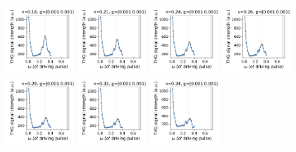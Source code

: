 \documentclass[a4paper]{article}
\begin{document}
\begin{figure}[H]
  \includegraphics[width=0.23\textwidth]{leggett-driving3-v7-case0.pdf}
  \includegraphics[width=0.23\textwidth]{leggett-driving3-v8-case0.pdf}
  \includegraphics[width=0.23\textwidth]{leggett-driving3-v9-case0.pdf}
  \includegraphics[width=0.23\textwidth]{leggett-driving3-v10-case0.pdf}
  \includegraphics[width=0.23\textwidth]{leggett-driving3-v11-case0.pdf}
  \includegraphics[width=0.23\textwidth]{leggett-driving3-v12-case0.pdf}
  \includegraphics[width=0.23\textwidth]{leggett-driving3-v13-case0.pdf}

\end{figure}
\end{document}
